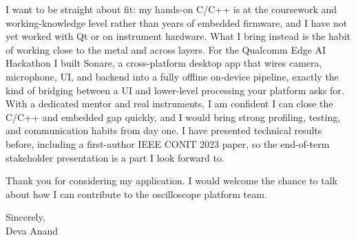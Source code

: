 \documentclass[letterpaper,11pt]{article}
\begin{document}
I want to be straight about fit: my hands-on C/C++ is at the coursework and working-knowledge level rather than years of embedded firmware, and I have not yet worked with Qt or on instrument hardware. What I bring instead is the habit of working close to the metal and across layers. For the Qualcomm Edge AI Hackathon I built Sonare, a cross-platform desktop app that wires camera, microphone, UI, and backend into a fully offline on-device pipeline, exactly the kind of bridging between a UI and lower-level processing your platform asks for. With a dedicated mentor and real instruments, I am confident I can close the C/C++ and embedded gap quickly, and I would bring strong profiling, testing, and communication habits from day one. I have presented technical results before, including a first-author IEEE CONIT 2023 paper, so the end-of-term stakeholder presentation is a part I look forward to.

Thank you for considering my application. I would welcome the chance to talk about how I can contribute to the oscilloscope platform team.

\vspace{6pt}
\noindent Sincerely, \\
Deva Anand
\end{document}
